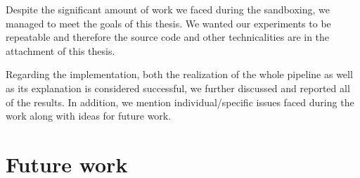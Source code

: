 Despite the significant amount of work we faced during the sandboxing, we managed to meet the goals of this thesis. We wanted our experiments to be repeatable and therefore the source code and other technicalities are in the attachment of this thesis.

Regarding the implementation, both the realization of the whole pipeline as well as its explanation is considered successful, we further discussed and reported all of the results. In addition, we mention individual/specific issues faced during the work along with ideas for future work.

\section*{Future work}

